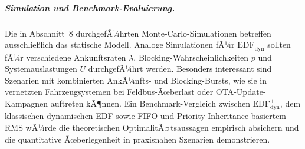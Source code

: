 ﻿\documentclass[a4paper,12pt]{article}
\theoremstyle{definition}
\begin{document}
	\subparagraph{Simulation und Benchmark-Evaluierung.}
	Die in Abschnitt~8 durchgefÃ¼hrten Monte-Carlo-Simulationen betreffen ausschlie\ss{}lich
	das statische Modell. Analoge Simulationen fÃ¼r EDF$^+_{\mathrm{dyn}}$ sollten
	fÃ¼r verschiedene Ankunftsraten $\lambda$, Blocking-Wahrscheinlichkeiten $p$ und
	Systemauslastungen $U$ durchgefÃ¼hrt werden. Besonders interessant sind
	Szenarien mit kombinierten AnkÃ¼nfts- und Blocking-Bursts, wie sie in
	vernetzten Fahrzeugsystemen bei Feldbus-Ãœberlast oder OTA-Update-Kampagnen
	auftreten kÃ¶nnen. Ein Benchmark-Vergleich zwischen EDF$^+_{\mathrm{dyn}}$,
	dem klassischen dynamischen EDF sowie FIFO und Priority-Inheritance-basiertem
	RMS wÃ¼rde die theoretischen OptimalitÃ¤tsaussagen empirisch absichern und
	die quantitative Ãœberlegenheit in praxisnahen Szenarien demonstrieren.
\end{document}
